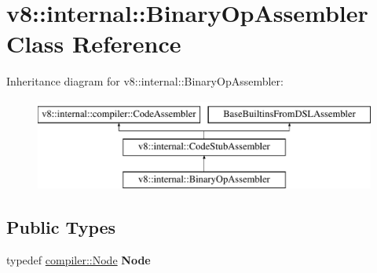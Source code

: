 \hypertarget{classv8_1_1internal_1_1BinaryOpAssembler}{}\section{v8\+:\+:internal\+:\+:Binary\+Op\+Assembler Class Reference}
\label{classv8_1_1internal_1_1BinaryOpAssembler}
Inheritance diagram for v8\+:\+:internal\+:\+:Binary\+Op\+Assembler\+:\begin{figure}[H]
\begin{center}
\leavevmode
\includegraphics[height=3.000000cm]{classv8_1_1internal_1_1BinaryOpAssembler}
\end{center}
\end{figure}
\subsection*{Public Types}
\begin{DoxyCompactItemize}
\item 
\mbox{\label{classv8_1_1internal_1_1BinaryOpAssembler_a73b15d97ccad0d1d8c2f6eec74d5aba9}} 
typedef \mbox{\hyperlink{classv8_1_1internal_1_1compiler_1_1Node}{compiler\+::\+Node}} {\bfseries Node}
\end{DoxyCompactItemize}
